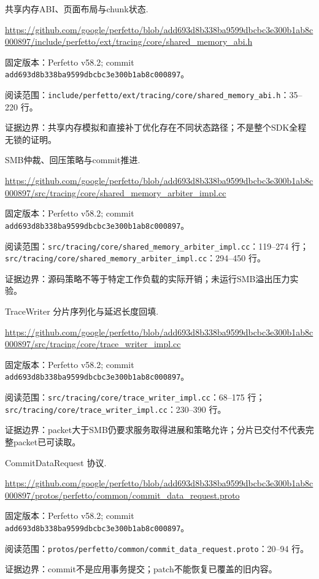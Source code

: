 \documentclass[UTF8,fontset=fandol,openany,11pt]{ctexbook}
\begin{document}
\begin{thebibliography}{999}
 共享内存ABI、页面布局与chunk状态.\par
\url{https://github.com/google/perfetto/blob/add693d8b338ba9599dbcbc3e300b1ab8c000897/include/perfetto/ext/tracing/core/shared_memory_abi.h}\par
{\small\raggedright 固定版本：Perfetto v58.2; commit \texttt{add693d8\allowbreak{}b338ba95\allowbreak{}99dbcbc3\allowbreak{}e300b1ab\allowbreak{}8c000897}。\par
阅读范围：\nolinkurl{include/perfetto/ext/tracing/core/shared_memory_abi.h}：35–220 行。\par
证据边界：共享内存模拟和直接补丁优化存在不同状态路径；不是整个SDK全程无锁的证明。
}

 SMB仲裁、回压策略与commit推进.\par
\url{https://github.com/google/perfetto/blob/add693d8b338ba9599dbcbc3e300b1ab8c000897/src/tracing/core/shared_memory_arbiter_impl.cc}\par
{\small\raggedright 固定版本：Perfetto v58.2; commit \texttt{add693d8\allowbreak{}b338ba95\allowbreak{}99dbcbc3\allowbreak{}e300b1ab\allowbreak{}8c000897}。\par
阅读范围：\nolinkurl{src/tracing/core/shared_memory_arbiter_impl.cc}：119–274 行；\nolinkurl{src/tracing/core/shared_memory_arbiter_impl.cc}：294–450 行。\par
证据边界：源码策略不等于特定工作负载的实际开销；未运行SMB溢出压力实验。
}

 TraceWriter 分片序列化与延迟长度回填.\par
\url{https://github.com/google/perfetto/blob/add693d8b338ba9599dbcbc3e300b1ab8c000897/src/tracing/core/trace_writer_impl.cc}\par
{\small\raggedright 固定版本：Perfetto v58.2; commit \texttt{add693d8\allowbreak{}b338ba95\allowbreak{}99dbcbc3\allowbreak{}e300b1ab\allowbreak{}8c000897}。\par
阅读范围：\nolinkurl{src/tracing/core/trace_writer_impl.cc}：68–175 行；\nolinkurl{src/tracing/core/trace_writer_impl.cc}：230–390 行。\par
证据边界：packet大于SMB仍要求服务取得进展和策略允许；分片已交付不代表完整packet已可读取。
}

 CommitDataRequest 协议.\par
\url{https://github.com/google/perfetto/blob/add693d8b338ba9599dbcbc3e300b1ab8c000897/protos/perfetto/common/commit_data_request.proto}\par
{\small\raggedright 固定版本：Perfetto v58.2; commit \texttt{add693d8\allowbreak{}b338ba95\allowbreak{}99dbcbc3\allowbreak{}e300b1ab\allowbreak{}8c000897}。\par
阅读范围：\nolinkurl{protos/perfetto/common/commit_data_request.proto}：20–94 行。\par
证据边界：commit不是应用事务提交；patch不能恢复已覆盖的旧内容。
}


\end{thebibliography}
\end{document}
